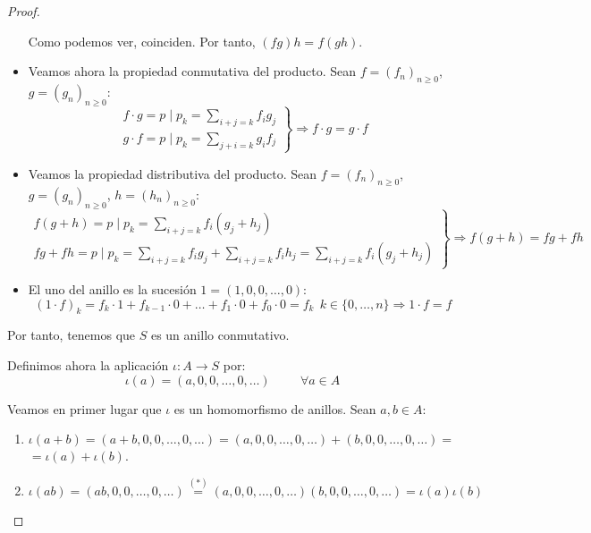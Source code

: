 \begin{proof}
\begin{itemize}
        Como podemos ver, coinciden. Por tanto, $(fg)h = f(gh)$.

        \item Veamos ahora la propiedad conmutativa del producto. Sean $f=(f_n)_{n\geq0}$, \newline $g=(g_n)_{n\geq0}$:
        $$\left. \begin{array}{l}
            f\cdot g = p \mid p_k = \sum\limits_{i+j=k} f_ig_j \\
            g \cdot f = p\mid p_k = \sum\limits_{j+i=k} g_if_j
        \end{array} \right\} \Longrightarrow f\cdot g = g\cdot f$$

        \item Veamos la propiedad distributiva del producto. Sean $f=(f_n)_{n\geq0}$, $g=(g_n)_{n\geq0}$, $h=(h_n)_{n\geq0}$:
        $$\left. \begin{array}{l}
            f(g+h) = p \mid p_k = \sum\limits_{i+j = k} f_i (g_j + h_j) \\
            fg + fh = p\mid p_k = \sum\limits_{i+j=k} f_ig_j + \sum\limits_{i+j=k} f_i h_j = \sum\limits_{i+j=k} f_i(g_j+h_j)
        \end{array}\right\} \Longrightarrow f(g+h) = fg + fh$$

        \item El uno del anillo es la sucesión $1=(1,0,0,\ldots, 0)$:
        $$(1\cdot f)_k = f_k \cdot 1 + f_{k-1} \cdot 0 + \ldots + f_1 \cdot 0 + f_0 \cdot 0 = f_k ~~ k \in \{0, \ldots, n\}
            \Longrightarrow 1 \cdot f = f$$
    \end{itemize}
    
    Por tanto, tenemos que $S$ es un anillo conmutativo.\\
    \bigskip
    
    Definimos ahora la aplicación $\iota:A\longrightarrow S$ por:
    $$\iota(a) = (a, 0, 0, \ldots, 0, \ldots) \hspace{1cm} \forall a \in A$$
    
    Veamos en primer lugar que $\iota$ es un homomorfismo de anillos. Sean $a,b \in A$:
    \begin{enumerate}
        \item $\iota(a+b) = (a+b, 0, 0, \ldots, 0, \ldots) = (a, 0, 0, \ldots, 0, \ldots) + (b, 0, 0, \ldots, 0, \ldots) = $ $=\iota(a)+\iota(b)$.

        \item $\iota(ab) = (ab, 0, 0, \ldots, 0, \ldots) \stackrel{(\ast)}{=} (a, 0, 0, \ldots, 0, \ldots) (b, 0, 0, \ldots, 0, \ldots) = \iota(a)\iota(b)$


\end{enumerate}
\end{proof}
